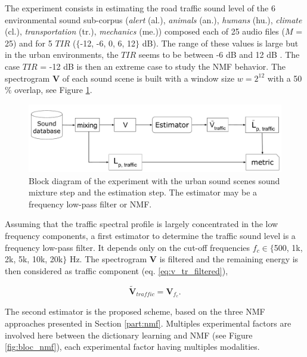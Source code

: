 \documentclass[twocolumn]{svjour3}          %
\begin{document}
The experiment consists in estimating the road traffic sound level of the 6 environmental sound sub-corpus (\textit{alert} (al.), \textit{animals} (an.), \textit{humans} (hu.), \textit{climate} (cl.), \textit{transportation} (tr.), \textit{mechanics} (me.)) composed each of 25 audio files ($M$ = 25) and for 5 $TIR$ ($\lbrace$-12, -6, 0, 6, 12$\rbrace$ dB). The range of these values is large but in the urban environments, the $TIR$ seems to be between -6 dB and 12 dB \cite{gloaguen_creation_2017}. The case $TIR$ = -12 dB is then an extreme case to study the NMF behavior.
The spectrogram $\mathbf{V}$ of each sound scene is built with a window size $w = 2^{12}$ with a 50 $\%$ overlap, see Figure \ref{fig:bloc_experiment}.

\begin{figure}
    \centering
    \includegraphics[width=\linewidth]{figures/bloc_diagram_estimator.pdf}
    \caption{Block diagram of the experiment with the urban sound scenes sound mixture step and the estimation step. The estimator may be a frequency low-pass filter or NMF.}
    \label{fig:bloc_experiment}
\end{figure}

Assuming that the traffic spectral profile is largely concentrated in the low frequency components, a first estimator to determine the traffic sound level is a frequency low-pass filter. It depends only on the cut-off frequencies $f_c \in  \lbrace$500, 1k, 2k, 5k, 10k, 20k$\rbrace$ Hz. The spectrogram $\mathbf{V}$ is filtered and the remaining energy is then considered as traffic component (eq. \ref{eq:v_tr_filtered}),

\begin{equation}\label{eq:v_tr_filtered}
\mathbf{\tilde{V}}_{traffic} = \mathbf{V}_{f_c}.
\end{equation}

The second estimator is the proposed scheme, based on the three NMF approaches presented in Section \ref{part:nmf}. Multiples experimental factors are involved here between the dictionary learning and NMF (see Figure \ref{fig:bloc_nmf}), each experimental factor having multiples modalities.
\end{document}
